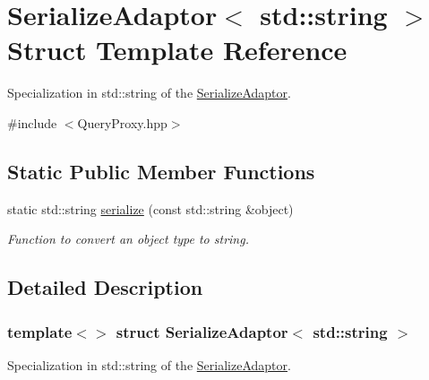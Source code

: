 \hypertarget{structSerializeAdaptor_3_01std_1_1string_01_4}{
\section{SerializeAdaptor$<$ std::string $>$ Struct Template Reference}
\label{structSerializeAdaptor_3_01std_1_1string_01_4}
}


Specialization in std::string of the \hyperlink{structSerializeAdaptor}{SerializeAdaptor}.  




{\ttfamily \#include $<$QueryProxy.hpp$>$}

\subsection*{Static Public Member Functions}
\begin{DoxyCompactItemize}
\item 
static std::string \hyperlink{structSerializeAdaptor_3_01std_1_1string_01_4_afd1715b0096be132bf205cfddeedf199}{serialize} (const std::string \&object)
\begin{DoxyCompactList}\small\item\em Function to convert an object type to string. \item\end{DoxyCompactList}\end{DoxyCompactItemize}


\subsection{Detailed Description}
\subsubsection*{template$<$$>$ struct SerializeAdaptor$<$ std::string $>$}

Specialization in std::string of the \hyperlink{structSerializeAdaptor}{SerializeAdaptor}. 

